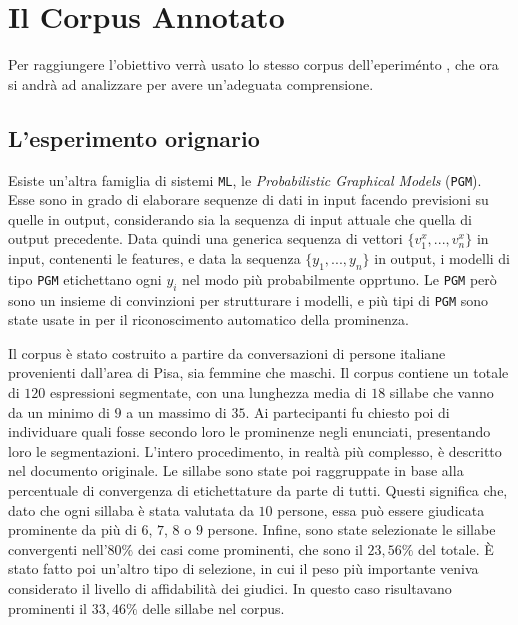 \documentclass[twoside,twocolumn,10pt]{extarticle}
\theoremstyle{definition}
\begin{document}
\section{Il Corpus Annotato}\label{sec:corpus}
	Per raggiungere l'obiettivo verrà usato lo stesso corpus dell'eperiménto \cite{bib:prominence-detection-italian}, che ora si andrà ad analizzare per avere un'adeguata comprensione.
	
	\subsection{L'esperimento orignario}
		Esiste un'altra famiglia di sistemi \texttt{ML}, le \textit{Probabilistic Graphical Models} (\texttt{PGM}). Esse sono in grado di elaborare sequenze di dati in input facendo previsioni su quelle in output, considerando sia la sequenza di input attuale che quella di output precedente. Data quindi una generica sequenza di vettori $\{v^x_1, ..., v^x_n\}$ in input, contenenti le features, e data la sequenza $\{y_1, ..., y_n\}$ in output, i modelli di tipo \texttt{PGM} etichettano ogni $y_i$ nel modo più probabilmente opprtuno. Le \texttt{PGM} però sono un insieme di convinzioni per strutturare i modelli, e più tipi di \texttt{PGM} sono state usate in \cite{bib:prominence-detection-italian} per il riconoscimento automatico della prominenza.
	
		Il corpus è stato costruito a partire da conversazioni di persone italiane provenienti dall'area di Pisa, sia femmine che maschi. Il corpus contiene un totale di $120$ espressioni segmentate, con una lunghezza media di $18$ sillabe che vanno da un minimo di $9$ a un massimo di $35$. Ai partecipanti fu chiesto poi di individuare quali fosse secondo loro le prominenze negli enunciati, presentando loro le segmentazioni. L'intero procedimento, in realtà più complesso, è descritto nel documento originale. Le sillabe sono state poi raggruppate in base alla percentuale di convergenza di etichettature da parte di tutti. Questi significa che, dato che ogni sillaba è stata valutata da $10$ persone, essa può essere giudicata prominente da più di $6$, $7$, $8$ o $9$ persone. Infine, sono state selezionate le sillabe convergenti nell'$80\%$ dei casi come prominenti, che sono il $23,56\%$ del totale. È stato fatto poi un'altro tipo di selezione, in cui il peso più importante veniva considerato il livello di affidabilità dei giudici. In questo caso risultavano prominenti il $33,46\%$ delle sillabe nel corpus.
		
\end{document}
